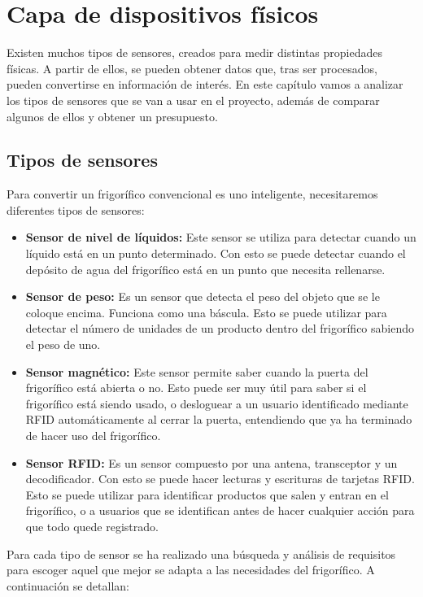 \chapter{Capa de dispositivos físicos}
Existen muchos tipos de sensores, creados para medir distintas propiedades físicas. A partir de ellos, se pueden obtener datos que, tras ser procesados, pueden convertirse en información de interés. En este capítulo vamos a analizar los tipos de sensores que se van a usar en el proyecto, además de comparar algunos de ellos y obtener un presupuesto.

\section{Tipos de sensores}
Para convertir un frigorífico convencional es uno inteligente, necesitaremos diferentes tipos de sensores:

\begin{itemize}
    \item \textbf{Sensor de nivel de líquidos:} Este sensor se utiliza para detectar cuando un líquido está en un punto determinado. Con esto se puede detectar cuando el depósito de agua del frigorífico está en un punto que necesita rellenarse.
    \item \textbf{Sensor de peso:} Es un sensor que detecta el peso del objeto que se le coloque encima. Funciona como una báscula. Esto se puede utilizar para detectar el número de unidades de un producto dentro del frigorífico sabiendo el peso de uno.
    \item \textbf{Sensor magnético:} Este sensor permite saber cuando la puerta del frigorífico está abierta o no. Esto puede ser muy útil para saber si el frigorífico está siendo usado, o desloguear a un usuario identificado mediante RFID automáticamente al cerrar la puerta, entendiendo que ya ha terminado de hacer uso del frigorífico.
    \item  \textbf{Sensor RFID:} Es un sensor compuesto por una antena, transceptor y un decodificador. Con esto se puede hacer lecturas y escrituras de tarjetas RFID. Esto se puede utilizar para identificar productos que salen y entran en el frigorífico, o a usuarios que se identifican antes de hacer cualquier acción para que todo quede registrado. 
\end{itemize}

Para cada tipo de sensor se ha realizado una búsqueda y análisis de requisitos para escoger  aquel que mejor se adapta a las necesidades del frigorífico. A continuación se detallan:

